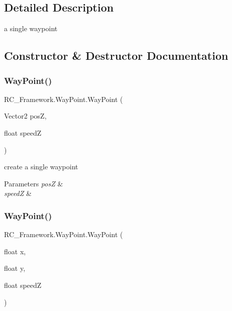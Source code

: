 \subsection{Detailed Description}
a single waypoint 



\subsection{Constructor \& Destructor Documentation}
\mbox{\label{class_r_c___framework_1_1_way_point_a2867a1184b66d64965e6fea2645a6ac0}} 
\subsubsection{\texorpdfstring{Way\+Point()}{WayPoint()}\hspace{0.1cm}{\footnotesize\ttfamily [1/3]}}
{\footnotesize\ttfamily R\+C\+\_\+\+Framework.\+Way\+Point.\+Way\+Point (\begin{DoxyParamCaption}\item[{Vector2}]{posZ,  }\item[{float}]{speedZ }\end{DoxyParamCaption})}



create a single waypoint 


\begin{DoxyParams}{Parameters}
{\em posZ} & \\
\hline
{\em speedZ} & \\
\hline
\end{DoxyParams}
\mbox{\label{class_r_c___framework_1_1_way_point_a9fb5f10082c779e78b1406a3287746f1}} 
\subsubsection{\texorpdfstring{Way\+Point()}{WayPoint()}\hspace{0.1cm}{\footnotesize\ttfamily [2/3]}}
{\footnotesize\ttfamily R\+C\+\_\+\+Framework.\+Way\+Point.\+Way\+Point (\begin{DoxyParamCaption}\item[{float}]{x,  }\item[{float}]{y,  }\item[{float}]{speedZ }\end{DoxyParamCaption})}




